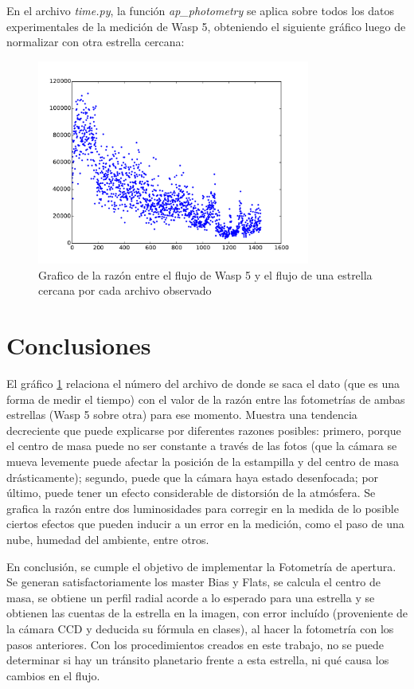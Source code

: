 \documentclass[a4paper, 11pt, spanish]{article}
\begin{document}
En el archivo \textit{time.py}, la funci\'on \textit{ap\_photometry} se aplica sobre todos los datos experimentales de la medici\'on  de Wasp 5, obteniendo el siguiente gr\'afico luego de normalizar con otra estrella cercana:

\begin{figure}[!htbp]
		\centering
		\includegraphics[width=0.8\textwidth]{img/flujo.pdf}
		\caption{Grafico de la raz\'on entre el flujo de Wasp 5 y el flujo de una estrella cercana por cada archivo observado}
		\label{fig:star}
	\end{figure}


\section{Conclusiones}


El gr\'afico \ref{fig:star} relaciona el n\'umero del archivo de donde se saca el dato (que es una forma de medir el tiempo) con el valor de la raz\'on entre las fotometr\'ias de ambas estrellas (Wasp 5 sobre otra) para ese momento. Muestra una tendencia decreciente que puede explicarse por diferentes razones posibles: primero, porque el centro de masa puede no ser constante a trav\'es de las fotos (que la c\'amara se mueva levemente puede afectar la posici\'on de la estampilla y del centro de masa dr\'asticamente); segundo, puede que la c\'amara haya estado desenfocada; por \'ultimo, puede tener un efecto considerable de distorsi\'on de la atm\'osfera. Se grafica la raz\'on entre dos luminosidades para corregir en la medida de lo posible ciertos efectos que pueden inducir a un error en la medici\'on, como el paso de una nube, humedad del ambiente, entre otros.

En conclusi\'on, se cumple el objetivo de implementar la Fotometr\'ia de apertura. Se generan satisfactoriamente los master  Bias y Flats, se calcula el centro de masa, se obtiene un perfil radial acorde a lo esperado para una estrella y se obtienen las cuentas de la estrella en la imagen, con error inclu\'ido (proveniente de la c\'amara CCD y deducida su f\'ormula en clases), al hacer la fotometr\'ia con los pasos anteriores. Con los procedimientos creados en este trabajo, no se puede determinar si hay un tr\'ansito planetario frente a esta estrella, ni qu\'e causa los cambios en el flujo. 
\end{document}
